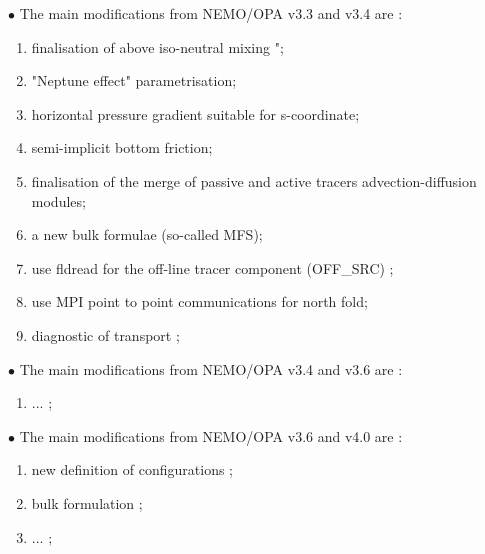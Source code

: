 \documentclass[../tex_main/NEMO_manual]{subfiles}
\begin{document}
 \vspace{1cm}
$\bullet$ The main modifications from NEMO/OPA v3.3 and  v3.4 are :\\
\begin{enumerate}
\item finalisation of above iso-neutral mixing \citep{Griffies_al_JPO98}"; 
\item "Neptune effect" parametrisation;
\item horizontal pressure gradient suitable for s-coordinate; 
\item semi-implicit bottom friction;
\item finalisation of the merge of passive and active tracers advection-diffusion modules; 
\item a new bulk formulae (so-called MFS);
\item use fldread for the off-line tracer component (OFF\_SRC) ; 
\item use MPI point to point communications  for north fold;
\item diagnostic of transport ; 
\end{enumerate}


 \vspace{1cm}
$\bullet$ The main modifications from NEMO/OPA v3.4 and  v3.6 are :\\
\begin{enumerate}
 \item ... ; 
\end{enumerate}


 \vspace{1cm}
$\bullet$ The main modifications from NEMO/OPA v3.6 and  v4.0 are :\\
\begin{enumerate}
\item new definition of configurations ;
\item bulk formulation ;
\item ... ; 
\end{enumerate}
\end{document}

